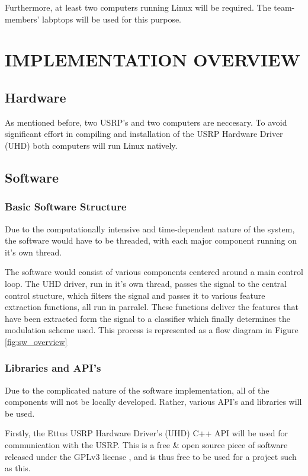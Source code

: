 \documentclass[10pt,twocolumn]{witseiepaper}
\begin{document}
		Furthermore, at least two computers running Linux will be required. The team-members' labptops will be used for this purpose.

\section{IMPLEMENTATION OVERVIEW}
	\subsection{Hardware}
	As mentioned before, two USRP's and two computers are neccesary. To avoid significant effort in compiling and installation of the USRP Hardware Driver (UHD) both computers will run Linux natively.

	\subsection{Software}
		\subsubsection{Basic Software Structure}
			Due to the computationally intensive and time-dependent nature of the system, the software would have to be threaded, with each major component running on it's own thread.

			The software would consist of various components centered around a main control loop. The UHD driver, run in it's own thread, passes the signal to the central control stucture, which filters the signal and passes it to various feature extraction functions, all run in parralel. These functions deliver the features that have been extracted form the signal to a classifier which finally determines the modulation scheme used. This process is represented as a flow diagram in Figure \ref{fig:sw_overview}
		\subsubsection{Libraries and API's}
			Due to the complicated nature of the software implementation, all of the components will not be locally developed. Rather, various API's and libraries will be used.

			Firstly, the Ettus USRP Hardware Driver's (UHD) C++ API will be used for communication with the USRP. This is a free \& open source piece of software released under the GPLv3 license \cite{uhd_license}, and is thus free to be used for a project such as this.
\end{document}
